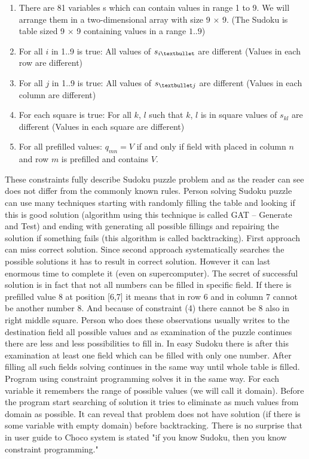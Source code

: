 \begin{enumerate}
\item	There are 81 variables s which can contain values in range 1 to 9. We will 
      arrange them in a two-dimensional array with size 9 $\times$ 9. 
      (The Sudoku is table sized 9 $\times$ 9 containing values in a range $1..9$)
\item	For all $i$ in 1..9 is true: All values of $s_{i \textbullet}$ are different 
      (Values in each row are different)
\item	For all $j$ in 1..9 is true: All values of $s_{\textbullet j}$ are different 
      (Values in each column are different)
\item	For each square is true: For all $k$, $l$ such that $k$, $l$ is in square values of 
      $s_{kl}$ are different (Values in each square are different)
\item	For all prefilled values: $q_{mn} = V$ if and only if field with placed in column 
      $n$ and row $m$ is prefilled and contains $V$.
\end{enumerate}

These constraints fully describe Sudoku puzzle problem and as the reader can see 
does not differ from the commonly known rules. Person solving Sudoku puzzle can 
use many techniques starting with randomly filling the table and looking if this 
is good solution (algorithm using this technique is called GAT -- Generate and Test) 
and ending with generating all possible fillings and repairing the solution if 
something fails (this algorithm is called backtracking). First approach can miss 
correct solution. Since second approach systematically searches the possible 
solutions it has to result in correct solution. However it can last enormous 
time to complete it (even on supercomputer). The secret of successful solution 
is in fact that not all numbers can be filled in specific field. If there is 
prefilled value 8 at position [6,7] it means that in row 6 and in column 7 
cannot be another number 8. And because of constraint (4) there cannot be 8 
also in right middle square. Person who does these observations usually writes 
to the destination field all possible values and as examination of the puzzle 
continues there are less and less possibilities to fill in. In easy Sudoku there 
is after this examination at least one field which can be filled with only one 
number. After filling all such fields solving continues in the same way until 
whole table is filled. Program using constraint programming solves it in the same 
way. For each variable it remembers the range of possible values (we will call it 
domain). Before the program start searching of solution it tries to eliminate as 
much values from domain as possible. It can reveal that problem does not have 
solution (if there is some variable with empty domain) before backtracking. There 
is no surprise that in user guide to Choco system is stated "if you know Sudoku, 
then you know constraint programming."

